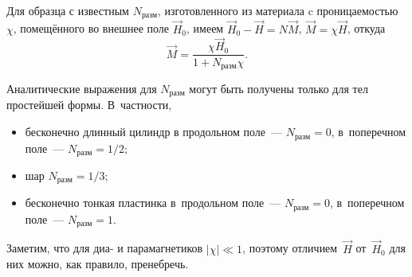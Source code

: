 Для образца с известным $N_{разм}$, изготовленного из материала
c проницаемостью $\chi$, помещённого во внешнее поле $\vec{H}_0$, имеем
$\vec{H}_0 - \vec{H} = N \vec{M}$, $\vec{M}=\chi \vec{H}$, откуда
\begin{equation}
\vec{M} = \frac{\chi \vec{H}_0}{1+N_{разм}\chi}.
\end{equation}

Аналитические выражения для $N_{разм}$ могут быть получены только для тел
простейшей формы. В~частности,
\begin{itemize}
    \item бесконечно длинный цилиндр в продольном поле~--- $N_{разм} = 0$,
          в~поперечном поле~--- $N_{разм} = 1/2$;
    \item шар $N_{разм} = 1/3$;
    \item бесконечно тонкая пластинка в~продольном поле~--- $N_{разм} = 0$,
    в~поперечном поле~--- $N_{разм} = 1$.
\end{itemize}

Заметим, что для диа- и парамагнетиков $|\chi|\ll 1$, поэтому 
отличием~$\vec H$ от~$\vec H_0$ для них можно, как правило, пренебречь.

